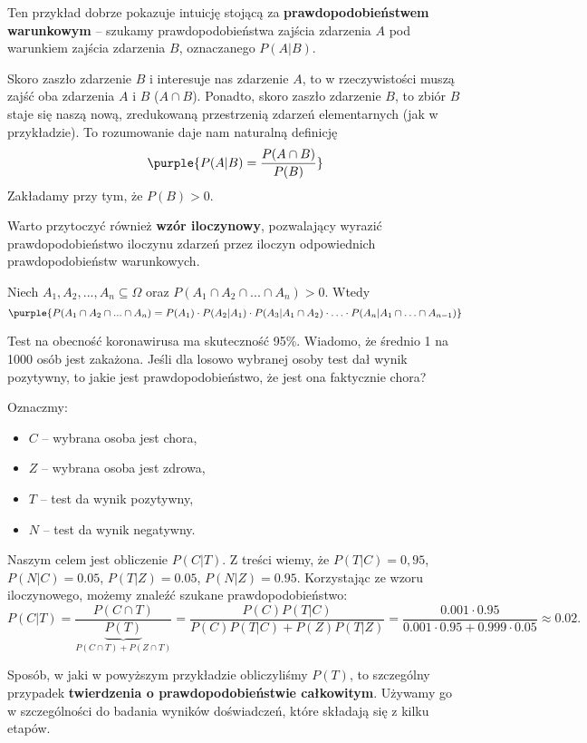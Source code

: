 Ten przykład dobrze pokazuje intuicję stojącą za \textbf{prawdopodobieństwem warunkowym} -- szukamy prawdopodobieństwa zajścia zdarzenia $A$ pod warunkiem zajścia zdarzenia $B$, oznaczanego $P(A | B)$.

Skoro zaszło zdarzenie $B$ i interesuje nas zdarzenie $A$, to w rzeczywistości muszą zajść oba zdarzenia $A$ i $B$ ($A \cap B$). Ponadto, skoro zaszło zdarzenie $B$, to zbiór $B$ staje się naszą nową, zredukowaną przestrzenią zdarzeń elementarnych (jak w przykładzie). To rozumowanie daje nam naturalną definicję
$$\purple{P(A | B) = \frac{P(A \cap B)}{P(B)}}$$
Zakładamy przy tym, że $P(B) > 0$.
\bigskip

Warto przytoczyć również \textbf{wzór iloczynowy}, pozwalający wyrazić prawdopodobieństwo iloczynu zdarzeń przez iloczyn odpowiednich prawdopodobieństw warunkowych.

Niech $A_1, A_2, ..., A_n \subseteq \Omega$ oraz $P(A_1 \cap A_2 \cap ... \cap A_n)>0$. Wtedy
$$
\purple{P(A_1 \cap A_2 \cap ... \cap A_n)=P(A_1)\cdot P(A_2|A_1)\cdot P(A_3|A_1\cap A_2)\cdot\ldots\cdot P(A_n|A_1\cap\ldots\cap A_{n-1})}
$$

\begin{example}
    Test na obecność koronawirusa ma skuteczność 95\%. Wiadomo, że średnio 1 na 1000 osób jest zakażona. Jeśli dla losowo wybranej osoby test dał wynik pozytywny, to jakie jest prawdopodobieństwo, że jest ona faktycznie chora?
    
    Oznaczmy:
    \begin{itemize}
        \item $C$ -- wybrana osoba jest chora,
        \item $Z$ -- wybrana osoba jest zdrowa,
        \item $T$ -- test da wynik pozytywny,
        \item $N$ -- test da wynik negatywny.
    \end{itemize}
    Naszym celem jest obliczenie $P(C|T)$. Z treści wiemy, że $P(T|C)=0,95$, $P(N|C)=0.05$, $P(T|Z)=0.05$, $P(N|Z)=0.95$. Korzystając ze wzoru iloczynowego, możemy znaleźć szukane prawdopodobieństwo:
    $$
    P(C|T) = \frac{P(C\cap T)}{\underbrace{P(T)}_{P(C\cap T)+P(Z\cap T)}} = \frac{P(C)P(T|C)}{P(C)P(T|C)+P(Z)P(T|Z)} = \frac{0.001\cdot0.95}{0.001\cdot0.95+0.999\cdot0.05} \approx 0.02.
    $$
\end{example}

Sposób, w jaki w powyższym przykładzie obliczyliśmy $P(T)$, to szczególny przypadek \textbf{twierdzenia o prawdopodobieństwie całkowitym}. Używamy go w szczególności do badania wyników doświadczeń, które składają się z kilku etapów.

